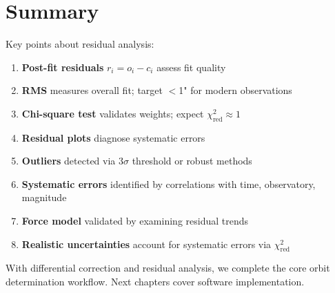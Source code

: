 \section{Summary}

Key points about residual analysis:

\begin{enumerate}
    \item \textbf{Post-fit residuals} $r_i = o_i - c_i$ assess fit quality
    \item \textbf{RMS} measures overall fit; target $<$1" for modern observations
    \item \textbf{Chi-square test} validates weights; expect $\chi^2_{\text{red}} \approx 1$
    \item \textbf{Residual plots} diagnose systematic errors
    \item \textbf{Outliers} detected via 3$\sigma$ threshold or robust methods
    \item \textbf{Systematic errors} identified by correlations with time, observatory, magnitude
    \item \textbf{Force model} validated by examining residual trends
    \item \textbf{Realistic uncertainties} account for systematic errors via $\chi^2_{\text{red}}$
\end{enumerate}

With differential correction and residual analysis, we complete the core orbit determination workflow. Next chapters cover software implementation.
